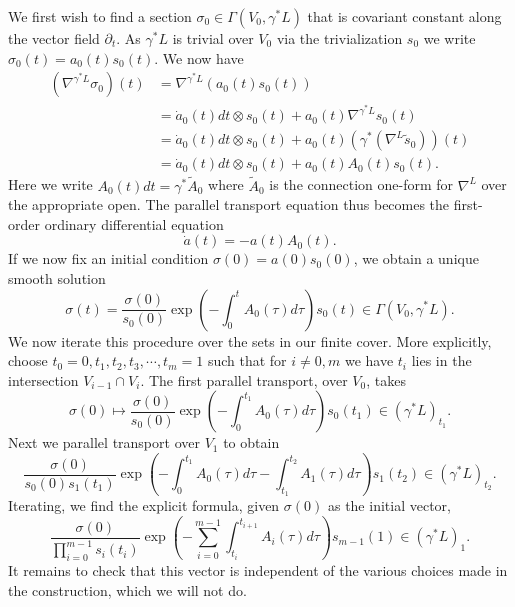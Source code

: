 \documentclass{amsart}
\begin{document}
We first wish to find a section $\sigma_0\in\Gamma(V_0,\gamma^*L)$ that is covariant constant
along the vector field $\partial_t$. As $\gamma^*L$ is trivial over $V_0$ via
the trivialization $s_0$ we write $\sigma_0(t) = a_0(t)s_0(t)$. We now have
\begin{align*}
    (\nabla^{\gamma^*L}\sigma_0)(t) &= \nabla^{\gamma^*L}(a_0(t)s_0(t)) \\
    &= \dot a_0(t) dt \otimes s_0(t) + a_0(t) \nabla^{\gamma^*L}s_0(t) \\
    &= \dot a_0(t) dt \otimes s_0(t) + a_0(t) (\gamma^*(\nabla^L \tilde s_0))(t) \\
    &= \dot a_0(t) dt \otimes s_0(t) + a_0(t) A_0(t)s_0(t).
\end{align*}
Here we write $A_0(t) dt=\gamma^*\tilde A_0$ where $\tilde A_0$ is the connection
one-form for $\nabla^L$ over the appropriate open. The parallel transport
equation thus becomes the first-order ordinary differential equation
\begin{equation*}
    \dot a(t) = - a(t) A_0(t).
\end{equation*}
If we now fix an initial condition $\sigma(0)=a(0)s_0(0)$, we obtain a unique smooth solution
\begin{equation*}
    \sigma(t) = \frac{\sigma(0)}{s_0(0)} \exp\left(-\int_0^{t} A_0(\tau) d\tau\right) s_0(t) \in \Gamma(V_0, \gamma^*L).
\end{equation*}
We now iterate this procedure over the sets in our finite cover. More explicitly,
choose $t_0=0, t_1, t_2, t_3, \cdots, t_m=1$ such that for $i\neq0,m$ we have $t_i$
lies in the intersection $V_{i-1}\cap V_i$. The first parallel transport, over $V_0$, takes
\begin{equation*}
    \sigma(0) \mapsto \frac{\sigma(0)}{s_0(0)}\exp\left( -\int_0^{t_1} A_0(\tau) d\tau \right) s_0(t_1) \in (\gamma^*L)_{t_1}.
\end{equation*}
Next we parallel transport over $V_1$ to obtain
\begin{equation*}
    \frac{\sigma(0)}{s_0(0)s_1(t_1)}\exp\left( -\int_0^{t_1}A_0(\tau)d\tau - \int_{t_1}^{t_2} A_1(\tau) d\tau \right) s_1(t_2) \in (\gamma^*L)_{t_2}.
\end{equation*}
Iterating, we find the explicit formula, given $\sigma(0)$ as the initial vector,
\begin{equation*}
    \frac{\sigma(0)}{\prod_{i=0}^{m-1} s_i(t_i)}\exp\left( -\sum_{i=0}^{m-1}\int_{t_i}^{t_{i+1}} A_i(\tau) d\tau \right) s_{m-1}(1) \in (\gamma^*L)_1.
\end{equation*}
It remains to check that this vector is independent of the various choices
made in the construction, which we will not do.
\end{document}

